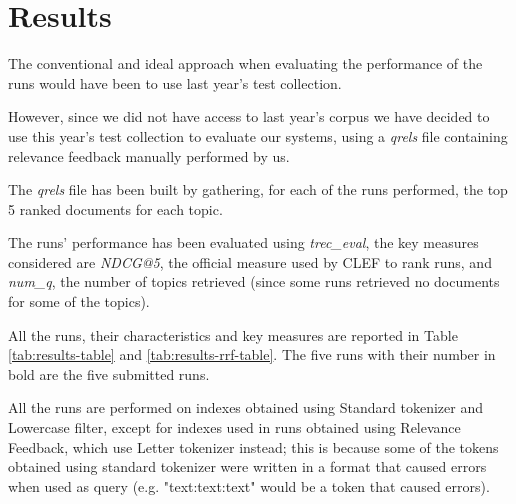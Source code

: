 \section{Results}
\label{sec:results}

The conventional and ideal approach when evaluating the performance of the runs would have been to use last year's test collection. \citep{bondarenko:2021d}

However, since we did not have access to last year's corpus we have decided to use this year's test collection to evaluate our systems, using a \textit{qrels} file containing relevance feedback manually performed by us.

The \textit{qrels} file has been built by gathering, for each of the runs performed, the top 5 ranked documents for each topic.

The runs' performance has been evaluated using \textit{trec\_eval}, the key measures considered are \textit{NDCG@5}, the official measure used by CLEF to rank runs, and \textit{num\_q}, the number of topics retrieved (since some runs retrieved no documents for some of the topics).

All the runs, their characteristics and key measures are reported in Table \ref{tab:results-table} and \ref{tab:results-rrf-table}. The five runs with their number in bold are the five submitted runs.

All the runs are performed on indexes obtained using Standard tokenizer and Lowercase filter, except for indexes used in runs obtained using Relevance Feedback, which use Letter tokenizer instead; this is because some of the tokens obtained using standard tokenizer were written in a format that caused errors when used as query (e.g. "text:text:text" would be a token that caused errors).

